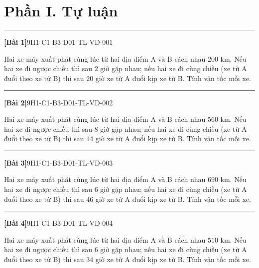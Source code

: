 \documentclass[12pt,a4paper]{article}
\newif\ifloigiai
\newenvironment{cauhoi}[2]{%
  \par\medskip\noindent\rule{\textwidth}{0.4pt}\par\nopagebreak
  \noindent\textbf{[#1]}\hfill{\scriptsize\ttfamily #2}\par\nopagebreak\smallskip}{\par}
\newcommand{\loigiai}[1]{\ifloigiai\par\smallskip\noindent\textit{Lời giải.} #1\par\fi}
\begin{document}
\section*{Phần I. Tự luận}
\begin{cauhoi}{Bài 1}{9H1-C1-B3-D01-TL-VD-001}
Hai xe máy xuất phát cùng lúc từ hai địa điểm A và B cách nhau $200$ km. Nếu hai xe đi ngược chiều thì sau $2$ giờ gặp nhau; nếu hai xe đi cùng chiều (xe từ A đuổi theo xe từ B) thì sau $20$ giờ xe từ A đuổi kịp xe từ B. Tính vận tốc mỗi xe.
\loigiai{Gọi vận tốc xe từ A là $x$ (km/h) và xe từ B là $y$ (km/h), $x>y>0$. Đi ngược chiều: $2(x+y)=200$, tức là $x+y=100$. Đi cùng chiều: $20(x-y)=200$, tức là $x-y=10$. Giải hệ ta được $x=55$, $y=45$ (thoả mãn). Vậy vận tốc xe từ A là 55 km/h, xe từ B là 45 km/h.}
\end{cauhoi}
\begin{cauhoi}{Bài 2}{9H1-C1-B3-D01-TL-VD-002}
Hai xe máy xuất phát cùng lúc từ hai địa điểm A và B cách nhau $560$ km. Nếu hai xe đi ngược chiều thì sau $8$ giờ gặp nhau; nếu hai xe đi cùng chiều (xe từ A đuổi theo xe từ B) thì sau $14$ giờ xe từ A đuổi kịp xe từ B. Tính vận tốc mỗi xe.
\loigiai{Gọi vận tốc xe từ A là $x$ (km/h) và xe từ B là $y$ (km/h), $x>y>0$. Đi ngược chiều: $8(x+y)=560$, tức là $x+y=70$. Đi cùng chiều: $14(x-y)=560$, tức là $x-y=40$. Giải hệ ta được $x=55$, $y=15$ (thoả mãn). Vậy vận tốc xe từ A là 55 km/h, xe từ B là 15 km/h.}
\end{cauhoi}
\begin{cauhoi}{Bài 3}{9H1-C1-B3-D01-TL-VD-003}
Hai xe máy xuất phát cùng lúc từ hai địa điểm A và B cách nhau $690$ km. Nếu hai xe đi ngược chiều thì sau $6$ giờ gặp nhau; nếu hai xe đi cùng chiều (xe từ A đuổi theo xe từ B) thì sau $46$ giờ xe từ A đuổi kịp xe từ B. Tính vận tốc mỗi xe.
\loigiai{Gọi vận tốc xe từ A là $x$ (km/h) và xe từ B là $y$ (km/h), $x>y>0$. Đi ngược chiều: $6(x+y)=690$, tức là $x+y=115$. Đi cùng chiều: $46(x-y)=690$, tức là $x-y=15$. Giải hệ ta được $x=65$, $y=50$ (thoả mãn). Vậy vận tốc xe từ A là 65 km/h, xe từ B là 50 km/h.}
\end{cauhoi}
\begin{cauhoi}{Bài 4}{9H1-C1-B3-D01-TL-VD-004}
Hai xe máy xuất phát cùng lúc từ hai địa điểm A và B cách nhau $510$ km. Nếu hai xe đi ngược chiều thì sau $6$ giờ gặp nhau; nếu hai xe đi cùng chiều (xe từ A đuổi theo xe từ B) thì sau $34$ giờ xe từ A đuổi kịp xe từ B. Tính vận tốc mỗi xe.
\loigiai{Gọi vận tốc xe từ A là $x$ (km/h) và xe từ B là $y$ (km/h), $x>y>0$. Đi ngược chiều: $6(x+y)=510$, tức là $x+y=85$. Đi cùng chiều: $34(x-y)=510$, tức là $x-y=15$. Giải hệ ta được $x=50$, $y=35$ (thoả mãn). Vậy vận tốc xe từ A là 50 km/h, xe từ B là 35 km/h.}
\end{cauhoi}
\end{document}
